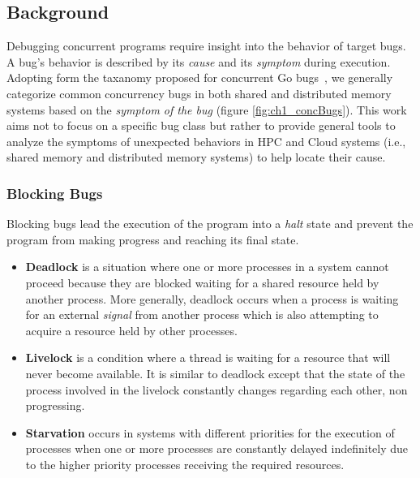\subsection{Background}
Debugging concurrent programs require insight into the behavior of target bugs.
%
A bug's behavior is described by its \textit{cause} and its \textit{symptom} during execution.
%
Adopting form the taxanomy proposed for concurrent Go bugs~\cite{tu-concurrentBugs-asplos19}, we generally categorize common concurrency bugs in both shared and distributed memory systems based on the \textit{symptom of the bug} (figure \ref{fig:ch1_concBugs}).
%
This work aims not to focus on a specific bug class but rather to provide general tools to analyze the symptoms of unexpected behaviors in HPC and Cloud systems (i.e., shared memory and distributed memory systems) to help locate their cause.

\subsubsection{Blocking Bugs}
Blocking bugs lead the execution of the program into a \textit{halt} state and prevent the program from making progress and reaching its final state.

\begin{itemize}
  \item \textbf{Deadlock} is a situation where one or more processes in a system cannot proceed because they are blocked waiting for a shared resource held by another process. More generally, deadlock occurs when a process is waiting for an external \textit{signal} from another process which is also attempting to acquire a resource held by other processes.
  \item \textbf{Livelock} is a condition where a thread is waiting for a resource that will never become available. It is similar to deadlock except that the state of the process involved in the livelock constantly changes regarding each other, non progressing.
  \item  \textbf{Starvation} occurs in systems with different priorities for the execution of processes when one or more processes are constantly delayed indefinitely due to the higher priority processes receiving the required resources.
\end{itemize}


